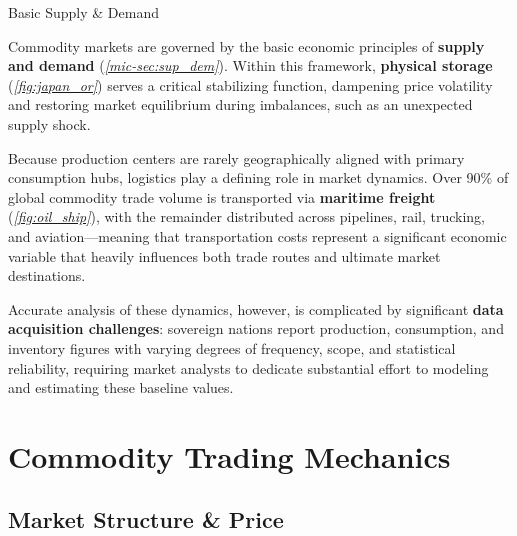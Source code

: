 \documentclass[10pt]{article}
\begin{document}
  \begin{core}{Basic Supply \& Demand}

    Commodity markets are governed by the basic economic principles of \textbf{supply and demand} (\textit{\autoref{mic-sec:sup_dem}}). Within this framework, \textbf{physical storage} (\textit{\autoref{fig:japan_or}}) serves a critical stabilizing function, dampening price volatility and restoring market equilibrium during imbalances, such as an unexpected supply shock.


    Because production centers are rarely geographically aligned with primary consumption hubs, logistics play a defining role in market dynamics. Over 90\% of global commodity trade volume is transported via \textbf{maritime freight} (\textit{\autoref{fig:oil_ship}}), with the remainder distributed across pipelines, rail, trucking, and aviation---meaning that transportation costs represent a significant economic variable that heavily influences both trade routes and ultimate market destinations.


    Accurate analysis of these dynamics, however, is complicated by significant \textbf{data acquisition challenges}: sovereign nations report production, consumption, and inventory figures with varying degrees of frequency, scope, and statistical reliability, requiring market analysts to dedicate substantial effort to modeling and estimating these baseline values.

  \end{core}

\section{Commodity Trading Mechanics}

  \subsection{Market Structure \& Price}
\end{document}
